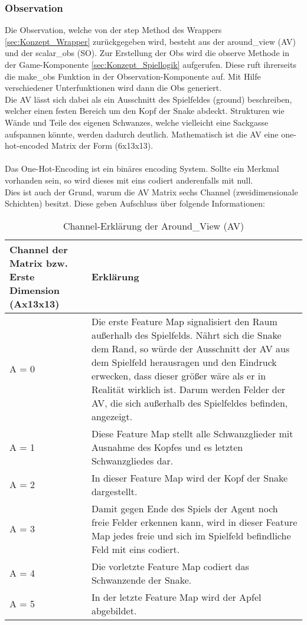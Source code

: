 \subsubsection{Observation} \label{sec:Konzept_Observation}
Die Observation, welche von der step Method des Wrappers \ref{sec:Konzept_Wrapper} zurückgegeben wird, besteht aus der around\_view (AV) und der scalar\_obs (SO). Zur Erstellung der Obs wird die observe Methode in der Game-Komponente \ref{sec:Konzept_Spiellogik} aufgerufen. Diese ruft ihrerseits die make\_obs Funktion in der Observation-Komponente auf. Mit Hilfe verschiedener Unterfunktionen wird dann die Obs generiert.\\
Die AV lässt sich dabei als ein Ausschnitt des Spielfeldes (ground) beschreiben, welcher einen festen Bereich um den Kopf der Snake abdeckt.
Strukturen wie Wände und Teile des eigenen Schwanzes, welche vielleicht eine Sackgasse aufspannen könnte, werden dadurch deutlich. Mathematisch ist die AV eine one-hot-encoded Matrix der Form (6x13x13).\\
\\Das One-Hot-Encoding ist ein binäres encoding System. Sollte ein Merkmal vorhanden sein, so wird dieses mit eins codiert anderenfalls mit null.\\
Dies ist auch der Grund, warum die AV Matrix sechs Channel (zweidimensionale Schichten) besitzt. Diese geben Aufschluss über folgende Informationen:
\begin{longtable}[h]{|p{4cm}|p{\linewidth - 5cm}|}
	\caption{Channel-Erklärung der Around\_View (AV)}
	\label{tab:around_view} 
	\endfirsthead
	\endhead
	\hline
	Channel der Matrix bzw. Erste Dimension (Ax13x13) & Erklärung \\
	\hline
	A = 0 & Die erste Feature Map signalisiert den Raum außerhalb des Spielfelds. Nährt sich die Snake dem Rand, so würde der Ausschnitt der AV aus dem Spielfeld herausragen und den Eindruck erwecken, dass dieser größer wäre als er in Realität wirklich ist. Darum werden Felder der AV, die sich außerhalb des Spielfeldes befinden, angezeigt.\\
	\hline
	A = 1 & Diese Feature Map stellt alle Schwanzglieder mit Ausnahme des Kopfes und es letzten Schwanzgliedes dar. \\
	\hline
	A = 2 & In dieser Feature Map wird der Kopf der Snake dargestellt. \\
	\hline
	A = 3 & Damit gegen Ende des Spiels der Agent noch freie Felder erkennen kann, wird in dieser Feature Map jedes freie und sich im Spielfeld befindliche Feld mit eins codiert. \\
	\hline
	A = 4 & Die vorletzte Feature Map codiert das Schwanzende der Snake. \\
	\hline
	A = 5 & In der letzte Feature Map wird der Apfel abgebildet. \\
	\hline
\end{longtable}
